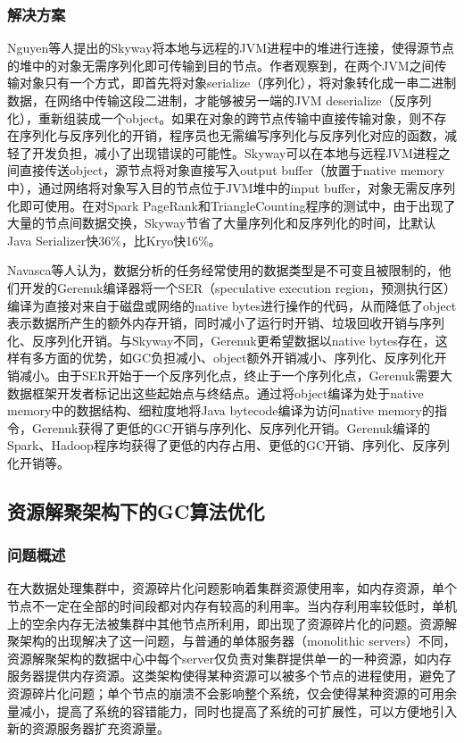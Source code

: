 \documentclass[lang=cn,12pt,a4paper,cite=authoryear]{elegantpaper}
\begin{document}
\subsubsection{解决方案}
Nguyen等人提出的Skyway\cite{DBLP:conf/asplos/NguyenFNXDL18}将本地与远程的JVM进程中的堆进行连接，使得源节点的堆中的对象无需序列化即可传输到目的节点。作者观察到，在两个JVM之间传输对象只有一个方式，即首先将对象serialize（序列化），将对象转化成一串二进制数据，在网络中传输这段二进制，才能够被另一端的JVM deserialize（反序列化），重新组装成一个object。如果在对象的跨节点传输中直接传输对象，则不存在序列化与反序列化的开销，程序员也无需编写序列化与反序列化对应的函数，减轻了开发负担，减小了出现错误的可能性。Skyway可以在本地与远程JVM进程之间直接传送object，源节点将对象直接写入output buffer（放置于native memory中），通过网络将对象写入目的节点位于JVM堆中的input buffer，对象无需反序列化即可使用。在对Spark PageRank和TriangleCounting程序的测试中，由于出现了大量的节点间数据交换，Skyway节省了大量序列化和反序列化的时间，比默认Java Serializer快36\%，比Kryo\cite{kyro}快16\%。

Navasca等人认为，数据分析的任务经常使用的数据类型是不可变且被限制的，他们开发的Gerenuk\cite{DBLP:conf/sosp/NavascaCNDLKX19}编译器将一个SER（speculative execution region，预测执行区）编译为直接对来自于磁盘或网络的native bytes进行操作的代码，从而降低了object表示数据所产生的额外内存开销，同时减小了运行时开销、垃圾回收开销与序列化、反序列化开销。与Skyway不同，Gerenuk更希望数据以native bytes存在，这样有多方面的优势，如GC负担减小、object额外开销减小、序列化、反序列化开销减小。由于SER开始于一个反序列化点，终止于一个序列化点，Gerenuk需要大数据框架开发者标记出这些起始点与终结点。通过将object编译为处于native memory中的数据结构、细粒度地将Java bytecode编译为访问native memory的指令，Gerenuk获得了更低的GC开销与序列化、反序列化开销。Gerenuk编译的Spark、Hadoop程序均获得了更低的内存占用、更低的GC开销、序列化、反序列化开销等。

\subsection{资源解聚架构下的GC算法优化}
\subsubsection{问题概述}
在大数据处理集群中，资源碎片化问题影响着集群资源使用率，如内存资源，单个节点不一定在全部的时间段都对内存有较高的利用率。当内存利用率较低时，单机上的空余内存无法被集群中其他节点所利用，即出现了资源碎片化的问题。资源解聚架构的出现解决了这一问题，与普通的单体服务器（monolithic servers）不同，资源解聚架构的数据中心中每个server仅负责对集群提供单一的一种资源，如内存服务器提供内存资源。这类架构使得某种资源可以被多个节点的进程使用，避免了资源碎片化问题；单个节点的崩溃不会影响整个系统，仅会使得某种资源的可用余量减小，提高了系统的容错能力，同时也提高了系统的可扩展性，可以方便地引入新的资源服务器扩充资源量。
\end{document}
